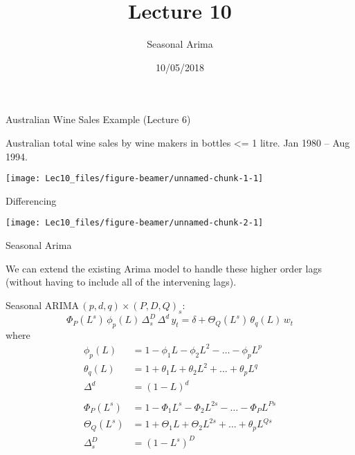 \documentclass[11pt,ignorenonframetext,]{beamer}
\title{Lecture 10}
\subtitle{Seasonal Arima}
\date{10/05/2018}
\begin{document}
\frame{\titlepage}

\begin{frame}{Australian Wine Sales Example (Lecture 6)}
\protect\hypertarget{australian-wine-sales-example-lecture-6}{}

Australian total wine sales by wine makers in bottles \textless{}= 1
litre. Jan 1980 -- Aug 1994.

\begin{center}\texttt{[image: Lec10\_files/figure-beamer/unnamed-chunk-1-1]} \end{center}

\end{frame}

\begin{frame}{Differencing}
\protect\hypertarget{differencing}{}

\begin{center}\texttt{[image: Lec10\_files/figure-beamer/unnamed-chunk-2-1]} \end{center}

\end{frame}

\begin{frame}[t]{Seasonal Arima}
\protect\hypertarget{seasonal-arima}{}

We can extend the existing Arima model to handle these higher order lags
(without having to include all of the intervening lags).

\vspace{3mm}

Seasonal \(\text{ARIMA}\,(p,d,q) \times (P,D,Q)_s\):
\[ \Phi_P(L^s) \, \phi_p(L) \, \Delta_s^D \, \Delta^d \, y_t = \delta + \Theta_Q(L^s) \, \theta_q(L) \, w_t\]
\pause where \[
\begin{aligned}
\phi_p(L) &= 1-\phi_1 L - \phi_2 L^2 - \ldots - \phi_p L^p\\
\theta_q(L) &= 1+\theta_1 L + \theta_2 L^2 + \ldots + \theta_p L^q \\
\Delta^d &= (1-L)^d\\
\\
\Phi_P(L^s) &= 1-\Phi_1 L^s - \Phi_2 L^{2s} - \ldots - \Phi_P L^{Ps} \\
\Theta_Q(L^s) &= 1+\Theta_1 L + \Theta_2 L^{2s} + \ldots + \theta_p L^{Qs} \\
\Delta_s^D &= (1-L^s)^D\\
\end{aligned}
\]

\end{frame}
\end{document}
